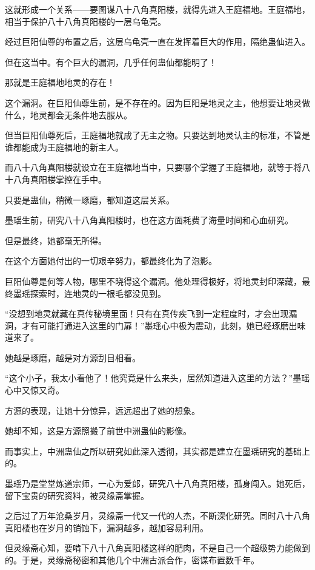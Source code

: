 \begin{this_body}
这就形成一个关系——要图谋八十八角真阳楼，就得先进入王庭福地。王庭福地，相当于保护八十八角真阳楼的一层乌龟壳。

经过巨阳仙尊的布置之后，这层乌龟壳一直在发挥着巨大的作用，隔绝蛊仙进入。

但在这当中。有个巨大的漏洞，几乎任何蛊仙都能明了！

那就是王庭福地地灵的存在！

这个漏洞。在巨阳仙尊生前，是不存在的。因为巨阳是地灵之主，他想要让地灵做什么，地灵都会无条件地去服从。

但当巨阳仙尊死后，王庭福地就成了无主之物。只要达到地灵认主的标准，不管是谁都能成为王庭福地的新主人。

而八十八角真阳楼就设立在王庭福地当中，只要哪个掌握了王庭福地，就等于将八十八角真阳楼掌控在手中。

只要是蛊仙，稍微一琢磨，都知道这层关系。

墨瑶生前，研究八十八角真阳楼时，也在这方面耗费了海量时间和心血研究。

但是最终，她都毫无所得。

在这个方面她付出的一切艰辛努力，都最终化为了泡影。

巨阳仙尊是何等人物，哪里不晓得这个漏洞。他处理得极好，将地灵封印深藏，最终墨瑶探索时，连地灵的一根毛都没见到。

“没想到地灵就藏在真传秘境里面！只有在真传疾飞到一定程度时，才会出现漏洞，才有可能打通进入这里的门扉！”墨瑶心中极为震动，此刻，她已经琢磨出味道来了。

她越是琢磨，越是对方源刮目相看。

“这个小子，我太小看他了！他究竟是什么来头，居然知道进入这里的方法？”墨瑶心中又惊又奇。

方源的表现，让她十分惊异，远远超出了她的想象。

她却不知，这是方源照搬了前世中洲蛊仙的影像。

而事实上，中洲蛊仙之所以研究如此深入透彻，其实都是建立在墨瑶研究的基础上的。

墨瑶乃是堂堂炼道宗师，一心为爱郎，研究八十八角真阳楼，孤身闯入。她死后，留下宝贵的研究资料，被灵缘斋掌握。

之后过了万年沧桑岁月，灵缘斋一代又一代的人杰，不断深化研究。同时八十八角真阳楼也在岁月的销蚀下，漏洞越多，越加容易利用。

但灵缘斋心知，要啃下八十八角真阳楼这样的肥肉，不是自己一个超级势力能做到的。于是，灵缘斋秘密和其他几个中洲古派合作，密谋布置数千年。


\end{this_body}
